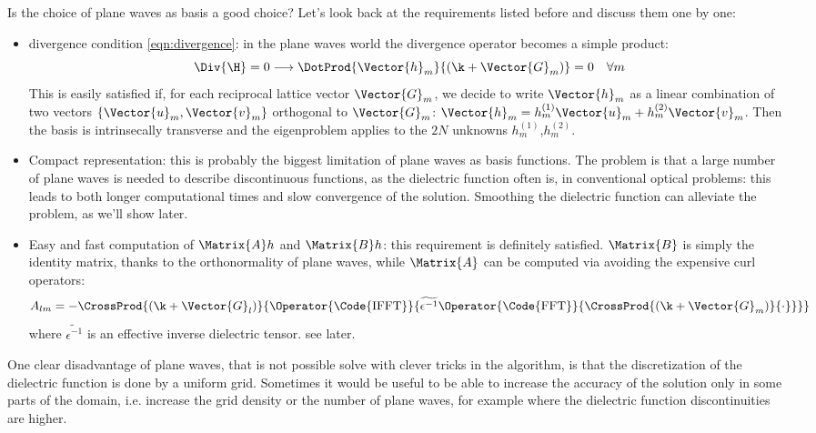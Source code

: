 Is the choice of plane waves as basis a good choice? Let's look back
at the requirements listed before and discuss them one by one:
\begin{itemize}
\item
  divergence condition \ref{eqn:divergence}: in the plane waves world
  the divergence operator becomes a simple product:
  $$
  \Div{\H} = 0 \longrightarrow \DotProd{\Vector{h}_m}{\left( \k +
  \Vector{G}_m \right)} = 0 \quad \forall m
  $$
  This is easily satisfied if, for each reciprocal lattice vector
  $\Vector{G}_m$, we decide to write $\Vector{h}_m$ as a linear
  combination of two vectors $\{\Vector{u}_m,\Vector{v}_m\}$
  orthogonal to $\Vector{G}_m$: $\Vector{h}_m = h_m^{(1)}\Vector{u}_m
  + h_m^{(2)}\Vector{v}_m$. Then the basis is intrinsecally transverse
  and the eigenproblem applies to the $2N$ unknowns
  $h_m^{(1)}$,$h_m^{(2)}$.
\item
  Compact representation: this is probably the biggest limitation of
  plane waves as basis functions. The problem is that a large number
  of plane waves is needed to describe discontinuous functions, as the
  dielectric function often is, in conventional optical
  problems: this leads to both longer computational times and slow
  convergence of the solution. Smoothing the dielectric function can
  alleviate the problem, as we'll show later.
\item
  Easy and fast computation of $\Matrix{A} h$ and $\Matrix{B} h$: this
  requirement is definitely satisfied. $\Matrix{B}$ is simply the
  identity matrix, thanks to the orthonormality of plane waves, while
  $\Matrix{A}$ can be computed via  avoiding the expensive
  curl operators:
  \begin{equation} \label{eqn:fast_operator}
  A_{lm} = - \CrossProd{(\k +
  \Vector{G}_l)}{\Operator{\mbox{\Code{IFFT}}}{\widetilde{\epsilon^{-1}}
  \Operator{\mbox{\Code{FFT}}}{\CrossProd{(\k +
  \Vector{G}_m)}{\cdot}}}}
  \end{equation}
  where $\widetilde{\epsilon^{-1}}$ is an effective inverse dielectric
  tensor. see later.
\end{itemize}

One clear disadvantage of plane waves, that is not possible solve with
clever tricks in the algorithm, is that the discretization of the
dielectric function is done by a uniform grid. Sometimes it would be
useful to be able to increase the accuracy of the solution only in
some parts of the domain, i.e. increase the grid density or the number
of plane waves, for example where the dielectric function
discontinuities are higher.


